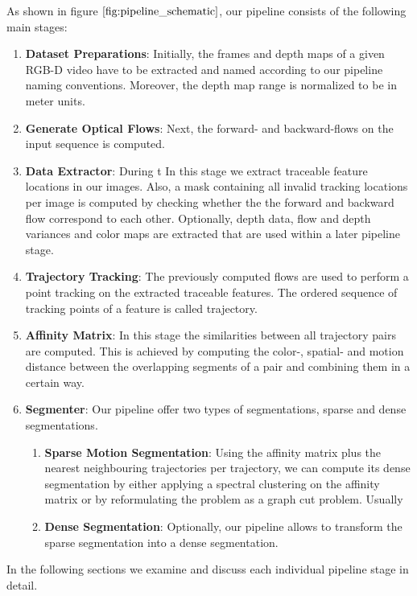 As shown in figure $\ref{fig:pipeline_schematic}$, our pipeline consists of the following main stages:
\begin{enumerate}
\item \textbf{Dataset Preparations}: Initially, the frames and depth maps of a given RGB-D video have to be extracted and named according to our pipeline naming conventions. Moreover, the depth map range is normalized to be in meter units.
\item \textbf{Generate Optical Flows}: Next, the forward- and backward-flows on the input sequence is computed.
\item \textbf{Data Extractor}: During t
In this stage we extract traceable feature locations in our images. Also, a mask containing all invalid tracking locations per image is computed by checking whether the the forward and backward flow correspond to each other. Optionally, depth data, flow and depth variances and color maps are extracted that are used within a later pipeline stage. 
\item \textbf{Trajectory Tracking}: The previously computed flows are used to perform a point tracking on the extracted traceable features. The ordered sequence of tracking points of a feature is called trajectory. 
\item \textbf{Affinity Matrix}: In this stage the similarities between all trajectory pairs are computed. This is achieved by computing the color-, spatial- and motion distance between the overlapping segments of a pair and combining them in a certain way.
\item \textbf{Segmenter}: Our pipeline offer two types of segmentations, sparse and dense segmentations. 
	\begin{enumerate}
	\item \textbf{Sparse Motion Segmentation}: Using the affinity matrix plus the nearest neighbouring trajectories per trajectory, we can compute its dense segmentation by either applying a spectral clustering on the affinity matrix or by reformulating the problem as a graph cut problem. Usually
	\item \textbf{Dense Segmentation}: Optionally, our pipeline allows to transform the sparse segmentation into a dense segmentation. 	
	\end{enumerate}
\end{enumerate}
In the following sections we examine and discuss each individual pipeline stage in detail. 

